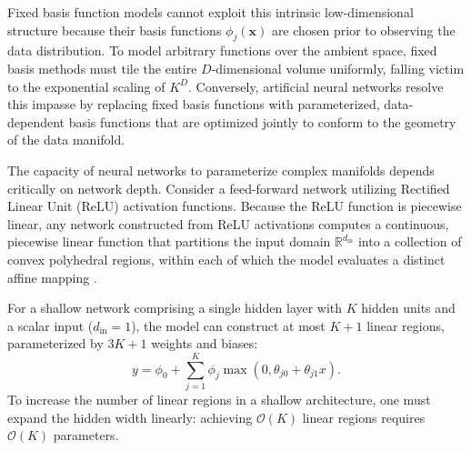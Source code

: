 \documentclass[../../main.tex]{subfiles}
\begin{document}
Fixed basis function models cannot exploit this intrinsic low-dimensional structure because their basis functions $\phi_j(\mathbf{x})$ are chosen prior to observing the data distribution. To model arbitrary functions over the ambient space, fixed basis methods must tile the entire $D$-dimensional volume uniformly, falling victim to the exponential scaling of $K^D$. Conversely, artificial neural networks resolve this impasse by replacing fixed basis functions with parameterized, data-dependent basis functions that are optimized jointly to conform to the geometry of the data manifold.

The capacity of neural networks to parameterize complex manifolds depends critically on network depth. Consider a feed-forward network utilizing Rectified Linear Unit ($\text{ReLU}$) activation functions. Because the ReLU function is piecewise linear, any network constructed from ReLU activations computes a continuous, piecewise linear function that partitions the input domain $\mathbb{R}^{d_{\text{in}}}$ into a collection of convex polyhedral regions, within each of which the model evaluates a distinct affine mapping \citep{prince2023udl,montufar2014number}.

For a shallow network comprising a single hidden layer with $K$ hidden units and a scalar input ($d_{\text{in}} = 1$), the model can construct at most $K + 1$ linear regions, parameterized by $3K + 1$ weights and biases:
\begin{equation}
y = \phi_0 + \sum_{j=1}^K \phi_j \max\left(0, \theta_{j0} + \theta_{j1}x\right).
\end{equation}
To increase the number of linear regions in a shallow architecture, one must expand the hidden width linearly: achieving $\mathcal{O}(K)$ linear regions requires $\mathcal{O}(K)$ parameters.
\end{document}
